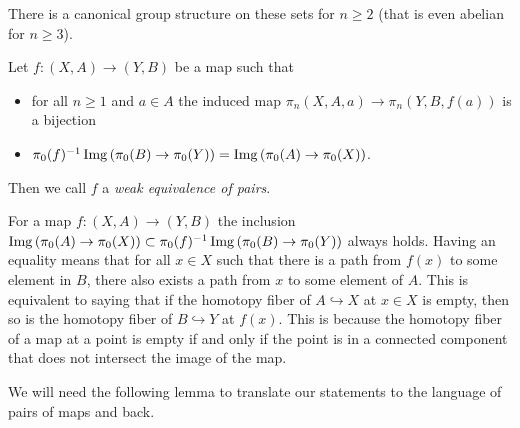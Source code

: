 There is a canonical group structure on these sets for $n\geq 2$ (that is even abelian for $n\geq 3$).
\begin{definition}\label{def:weOfPairs}
    Let $f\colon(X,A)\to (Y,B)$ be a map such that 
    \begin{itemize}
        \item for all $n\geq 1$ and $a\in A$ the induced map $\pi_n(X,A,a)\to\pi_n(Y,B,f(a))$ is a bijection
        \item $\pi_0(f)^{-1}\operatorname{Img}\left(\pi_0(B)\to\pi_0(Y)\right)=\operatorname{Img}\left(\pi_0(A)\to\pi_0(X)\right)$.
    \end{itemize}
    Then we call $f$ a \emph{weak equivalence of pairs}.
\end{definition}
\begin{remark}\label{rmk:emptyFiber}
    For a map $f\colon(X,A)\to (Y,B)$ the inclusion $\operatorname{Img}\left(\pi_0(A)\to\pi_0(X)\right)\subset\pi_0(f)^{-1}\operatorname{Img}\left(\pi_0(B)\to\pi_0(Y)\right)$ always holds.
    Having an equality means that for all $x\in X$ such that there is a path from $f(x)$ to some element in $B$, there also exists a path from $x$ to some element of $A$.
    This is equivalent to saying that if the homotopy fiber of $A\hookrightarrow X$ at $x\in X$ is empty, then so is the homotopy fiber of $B\hookrightarrow Y$ at $f(x)$.
    This is because the homotopy fiber of a map at a point is empty if and only if the point is in a connected component that does not intersect the image of the map.
\end{remark}
We will need the following lemma to translate our statements to the language of pairs of maps and back.
